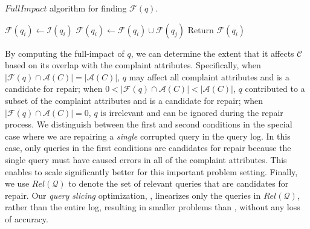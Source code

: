 
\vspace*{-.1in}
\begin{algorithm}[t]
\scriptsize
\caption{$FullImpact$ algorithm for finding $\mathcal{F}(q)$.}
\label{alg:fullimpact}
\begin{algorithmic}[2]
\STATE $\mathcal{F}(q_i) \leftarrow \mathcal{I}(q_i)$
\STATE $\mathcal{F}(q_i) \leftarrow \mathcal{F}(q_i) \cup \mathcal{F}(q_j)$
\ENDIF
\ENDFOR
\STATE Return $\mathcal{F}(q_i)$
\end{algorithmic}
\end{algorithm}
\vspace*{-.1in}

By computing the full-impact of $q$, we can determine the extent that it affects $\mathcal{C}$
based on its overlap with the complaint attributes.
Specifically, 
when $|\mathcal{F}(q) \cap \mathcal{A}(C)|=|\mathcal{A}(C)|$, $q$ may affect all complaint attributes and is a candidate for repair; 
when $0 < |\mathcal{F}(q) \cap \mathcal{A}(C)| < |\mathcal{A}(C)|$, 
$q$ contributed to a subset of the complaint attributes and is a candidate for repair;
when $|\mathcal{F}(q) \cap \mathcal{A}(C)|=0$, $q$ is irrelevant 
and can be ignored during the repair process.
We distinguish between the first and second conditions in the special case where we are repairing a \emph{single} 
corrupted query in the query log.  In this case, only queries in the first conditions are candidates for repair because 
the single query must have caused errors in all of the complaint attributes.  This enables \sys to scale significantly better
for this important problem setting. 
Finally, we use $Rel\mathcal{(Q)}$ to denote the set of relevant
queries that are candidates for repair. Our \emph{query slicing}
optimization, \qslice, linearizes only the queries in
$Rel\mathcal{(Q)}$, rather than the entire log, resulting in
smaller problems than \naive, without any loss of accuracy.

